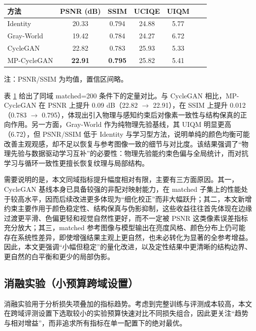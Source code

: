 \documentclass[a4paper,zihao=-4,linespread=1.25]{ctexart}
\begin{document}
\begin{table}[H]
    \centering
    \label{tab:euvp_main}
    \begin{tabular}{lcccccc}
        \toprule
        方法 & PSNR (dB) & SSIM & UCIQE & UIQM \\
        \midrule
        Identity & 20.33 & 0.794 & 24.88 & 5.77 \\
        Gray-World & 19.42 & 0.784 & 24.27 & 6.72 \\
        CycleGAN & 22.82 & 0.783 & 25.93 & 5.33 \\
        MP-CycleGAN & \textbf{22.91} & \textbf{0.795} & 25.82 & 5.41 \\
        \bottomrule
    \end{tabular}
    \vspace{0.5em}
    \par{\songti 注：PSNR/SSIM 为均值，置信区间略。}
\end{table}

表 \ref{tab:euvp_main} 给出了同域 matched=200 条件下的定量对比。与 CycleGAN 相比，MP-CycleGAN 在 PSNR 上提升 0.09 dB（22.82 $\to$ 22.91），在 SSIM 上提升 0.012（0.783 $\to$ 0.795），体现出引入物理与感知约束后对像素一致性与结构保真的正向作用。另一方面，Gray-World 作为纯物理先验基线，其 UIQM 明显更高（6.72），但 PSNR/SSIM 低于 Identity 与学习型方法，说明单纯的颜色均衡可能改善主观观感，却不足以恢复与参考图像一致的细节与对比度。该结果强调了“物理先验与数据驱动学习互补”的必要性：物理先验能约束色偏与全局统计，而对抗学习与循环一致性更擅长恢复纹理与局部结构。

需要说明的是，本文同域指标提升幅度相对有限，主要有三方面原因。其一，CycleGAN 基线本身已具备较强的非配对映射能力，在 matched 子集上的性能处于较高水平，因而后续改进更多体现为“细化校正”而非大幅跃升；其二，本文新增约束主要作用于颜色稳定性、结构保真与伪影抑制，这些收益往往首先体现在边缘过渡更平滑、色偏更轻和视觉自然性更好，而不一定被 PSNR 这类像素误差指标充分放大；其三，matched 参考图像与模型输出在亮度风格、颜色分布上仍可能存在系统性差异，即使增强结果主观上更自然，也未必转化为显著的全参考增益。因此，本文更强调“小幅但稳定”的量化改进，以及定性结果中更清晰的结构边界、更自然的白平衡和更少的局部伪影。

\subsection{消融实验（小预算跨域设置）}
消融实验用于分析损失项叠加的指标趋势。考虑到完整训练与评测成本较高，本文在跨域评测设置下选取较小的实验预算快速对比不同损失组合，因此更关注“趋势与相对增益”，而非追求所有指标在单一配置下的绝对最优。
\end{document}
